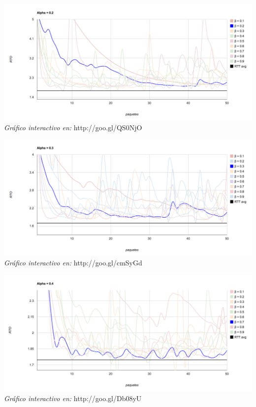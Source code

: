 \begin{center}
	\includegraphics[scale=0.35]{graphics/rto_vs_paquetes_a_2.png}
	\textit{Gráfico interactivo en:} http://goo.gl/QS0NjO
\end{center}

\begin{center}
	\includegraphics[scale=0.35]{graphics/rto_vs_paquetes_a_3.png}
	\textit{Gráfico interactivo en:} http://goo.gl/cmSyGd
\end{center}

\begin{center}
	\includegraphics[scale=0.35]{graphics/rto_vs_paquetes_a_4.png}
	\textit{Gráfico interactivo en:} http://goo.gl/Db08yU
\end{center}

